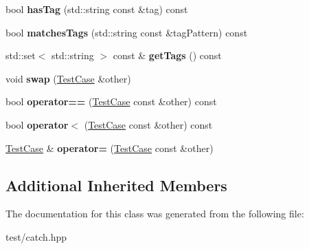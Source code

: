 \begin{DoxyCompactItemize}
\item 
bool {\bfseries has\+Tag} (std\+::string const \&tag) const \hypertarget{classCatch_1_1TestCase_ae3c1a0898ee9936cd1d4f207e3903308}{}\label{classCatch_1_1TestCase_ae3c1a0898ee9936cd1d4f207e3903308}

\item 
bool {\bfseries matches\+Tags} (std\+::string const \&tag\+Pattern) const \hypertarget{classCatch_1_1TestCase_a89cf3a144b6f256b6a533a631f7a8b0c}{}\label{classCatch_1_1TestCase_a89cf3a144b6f256b6a533a631f7a8b0c}

\item 
std\+::set$<$ std\+::string $>$ const \& {\bfseries get\+Tags} () const \hypertarget{classCatch_1_1TestCase_aa4313341335b9a9ebbe4682c0d808b32}{}\label{classCatch_1_1TestCase_aa4313341335b9a9ebbe4682c0d808b32}

\item 
void {\bfseries swap} (\hyperlink{classCatch_1_1TestCase}{Test\+Case} \&other)\hypertarget{classCatch_1_1TestCase_aee38f908faf10b905b209ca388275413}{}\label{classCatch_1_1TestCase_aee38f908faf10b905b209ca388275413}

\item 
bool {\bfseries operator==} (\hyperlink{classCatch_1_1TestCase}{Test\+Case} const \&other) const \hypertarget{classCatch_1_1TestCase_a40eab521b316c7d476f6b4dd1c33eec8}{}\label{classCatch_1_1TestCase_a40eab521b316c7d476f6b4dd1c33eec8}

\item 
bool {\bfseries operator$<$} (\hyperlink{classCatch_1_1TestCase}{Test\+Case} const \&other) const \hypertarget{classCatch_1_1TestCase_aa5174e85e3aac6e7398dee9c76730324}{}\label{classCatch_1_1TestCase_aa5174e85e3aac6e7398dee9c76730324}

\item 
\hyperlink{classCatch_1_1TestCase}{Test\+Case} \& {\bfseries operator=} (\hyperlink{classCatch_1_1TestCase}{Test\+Case} const \&other)\hypertarget{classCatch_1_1TestCase_a8022e3f74232f7887d2d2cbbc8876502}{}\label{classCatch_1_1TestCase_a8022e3f74232f7887d2d2cbbc8876502}

\end{DoxyCompactItemize}
\subsection*{Additional Inherited Members}


The documentation for this class was generated from the following file\+:\begin{DoxyCompactItemize}
\item 
test/catch.\+hpp\end{DoxyCompactItemize}

